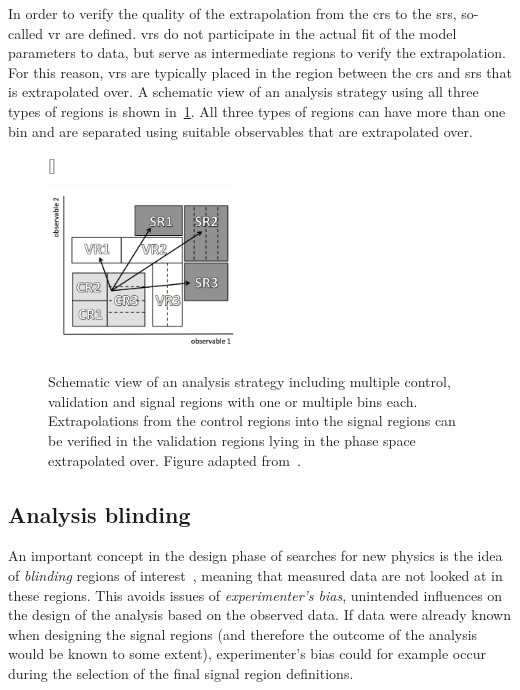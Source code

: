 In order to verify the quality of the extrapolation from the \glspl{cr} to the \glspl{sr}, so-called \gls{vr} are defined. \glspl{vr} do not participate in the actual fit of the model parameters to data, but serve as intermediate regions to verify the extrapolation. For this reason, \glspl{vr} are typically placed in the region between the \glspl{cr} and \glspl{sr} that is extrapolated over. A schematic view of an analysis strategy using all three types of regions is shown in~\cref{fig:hf_strategy}. All three types of regions can have more than one bin and are separated using suitable observables that are extrapolated over.


\begin{figure}
[\FBwidth]
{\caption{Schematic view of an analysis strategy including multiple control, validation and signal regions with one or multiple bins each. Extrapolations from the control regions into the signal regions can be verified in the validation regions lying in the phase space extrapolated over. Figure adapted from~\cite{HistFitter:2014wma}.}\label{fig:hf_strategy}}
{\includegraphics[width=0.45\textwidth]{hf_strategy}}
\end{figure}

\subsection{Analysis blinding}

An important concept in the design phase of searches for new physics is the idea of \textit{blinding} regions of interest~\cite{blind:2003rw}, meaning that measured data are not looked at in these regions. This avoids issues of \textit{experimenter's bias}, \ie unintended influences on the design of the analysis based on the observed data. If data were already known when designing the signal regions (and therefore the outcome of the analysis would be known to some extent), experimenter's bias could for example occur during the selection of the final signal region definitions.


